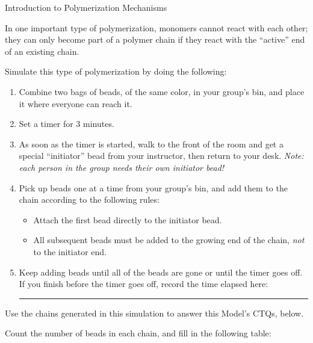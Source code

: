 \begin{activity}{Introduction to Polymerization Mechanisms}
\begin{instructornotes}
\end{instructornotes}

\newcommand{\timeallowed}{3 minutes}

\begin{model}
\label{\labelbase:mdl:chaingrowth}

	In one important type of polymerization, monomers cannot react with each other; they can only become part of a polymer chain if they react with the ``active'' end of an existing chain.
	
	Simulate this type of polymerization by doing the following:
	\begin{enumerate}
		\item Combine two bags of beads, of the same color, in your group's bin, and place it where everyone can reach it.
		\item Set a timer for \timeallowed.
		\item As soon as the timer is started, walk to the front of the room and get a special ``initiator'' bead from your instructor, then return to your desk. \emph{Note: each person in the group needs their own initiator bead!}
		\item Pick up beads one at a time from your group's bin, and add them to the chain according to the following rules:
			\begin{itemize}
				\item Attach the first bead directly to the initiator bead.
				\item All subsequent beads must be added to the growing end of the chain, \emph{not} to the initiator end.
			\end{itemize}
		\item Keep adding beads until all of the beads are gone or until the timer goes off.  If you finish before the timer goes off, record the time elapsed here: \rule{1in}{0.15mm}
	\end{enumerate}
	
	Use the chains generated in this simulation to answer this Model's CTQs, below.

\end{model}

\vspace{0.05in}
\begin{ctqs}

	\question Count the number of beads in each chain, and fill in the following table: \label{\labelbase:ctq:numbeadschain}
		

\end{ctqs}
\end{activity}
